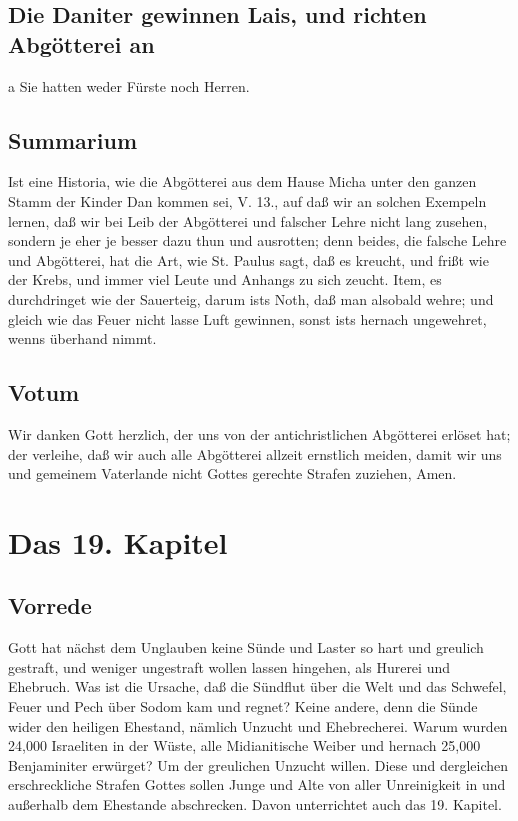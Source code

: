 \section{Die Daniter gewinnen Lais, und richten Abgötterei an}

a Sie hatten weder Fürste noch Herren.
\section{Summarium}

Ist eine Historia, wie die Abgötterei aus dem Hause Micha unter den ganzen Stamm der Kinder Dan kommen sei, V. 13., auf daß wir an solchen Exempeln lernen, daß wir bei Leib der Abgötterei und falscher Lehre nicht lang zusehen, sondern je eher je besser dazu thun und ausrotten; denn beides, die falsche Lehre und Abgötterei, hat die Art, wie St. Paulus sagt, daß es kreucht, und frißt wie der Krebs, und immer viel Leute und Anhangs zu sich zeucht. Item, es durchdringet wie der Sauerteig, darum ists Noth, daß man alsobald wehre; und gleich wie das Feuer nicht lasse Luft gewinnen, sonst ists hernach ungewehret, wenns überhand nimmt.

\section{Votum}

Wir danken Gott herzlich, der uns von der antichristlichen Abgötterei erlöset hat; der verleihe, daß wir auch alle Abgötterei allzeit ernstlich meiden, damit wir uns und gemeinem Vaterlande nicht Gottes gerechte Strafen zuziehen, Amen.
\chapter{Das 19. Kapitel}

\section{Vorrede}

Gott hat nächst dem Unglauben keine Sünde und Laster so hart und greulich gestraft, und weniger ungestraft wollen lassen hingehen, als Hurerei und Ehebruch. Was ist die Ursache, daß die Sündflut über die Welt und das Schwefel, Feuer und Pech über Sodom kam und regnet? Keine andere, denn die Sünde wider den heiligen Ehestand, nämlich Unzucht und Ehebrecherei. Warum wurden 24,000 Israeliten in der Wüste, alle Midianitische Weiber und hernach 25,000 Benjaminiter erwürget? Um der greulichen Unzucht willen. Diese und dergleichen erschreckliche Strafen Gottes sollen Junge und Alte von aller Unreinigkeit in und außerhalb dem Ehestande abschrecken. Davon unterrichtet auch das 19. Kapitel.

